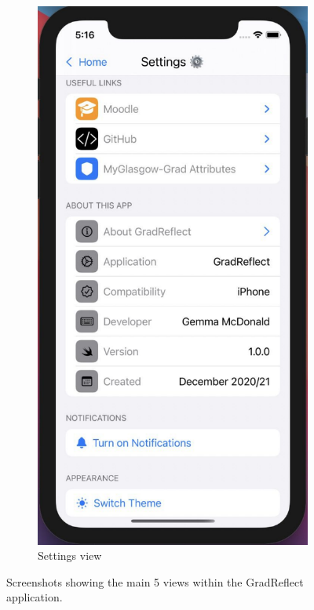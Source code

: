\documentclass{l4proj}
\begin{document}
\begin{figure}
    \begin{subfigure}[b]{0.3\textwidth}
        \includegraphics[scale=0.25]{images/appSettingsScreen.pdf}
        \caption{Settings view}
        \label{fig:appSettingsScreen}
    \end{subfigure}  
    \caption{Screenshots showing the main 5 views within the GradReflect application.}
    \label{fig:appMainViews}
\end{figure}
\end{document}
